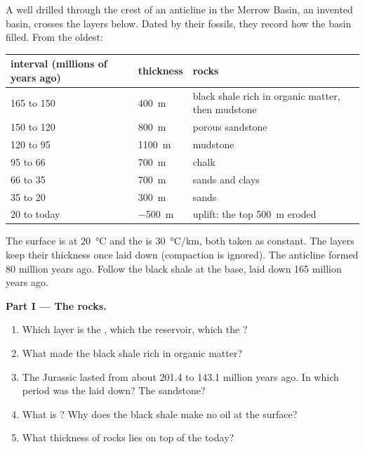 \begin{problem}
\label{pb:g11:fossil-fuel-geology:1}
A well drilled through the crest of an anticline in the Merrow Basin, an
invented basin, crosses the layers below. Dated by their fossils, they
record how the basin filled. From the oldest:
\begin{center}
\small
\begin{tabular}{|l|l|l|}
\hline
\textbf{interval (millions of years ago)} & \textbf{thickness} & \textbf{rocks} \\
\hline
165 to 150 & \qty{400}{m} & black shale rich in organic matter, then mudstone \\
150 to 120 & \qty{800}{m} & porous sandstone \\
120 to 95 & \qty{1100}{m} & mudstone \\
95 to 66 & \qty{700}{m} & chalk \\
66 to 35 & \qty{700}{m} & sands and clays \\
35 to 20 & \qty{300}{m} & sands \\
20 to today & \qty{-500}{m} & uplift: the top \qty{500}{m} eroded \\
\hline
\end{tabular}
\end{center}
The surface is at \qty{20}{\degreeCelsius} and the  is
\qty{30}{\degreeCelsius/km}, both taken as constant. The layers keep their
thickness once laid down (compaction is ignored). The anticline formed 80
million years ago. Follow the black shale at the base, laid down 165 million
years ago.

\medskip
\noindent\textbf{Part I --- The rocks.}
\begin{enumerate}
  \item Which layer is the , which the reservoir, which the ?
  \item What made the black shale rich in organic matter?
  \item The Jurassic lasted from about \num{201.4} to \num{143.1} million
        years ago. In which period was the  laid down? The
        sandstone?
  \item What is ? Why does the black shale make no oil at the
        surface?
  \item What thickness of rocks lies on top of the  today?
\end{enumerate}


\end{problem}
